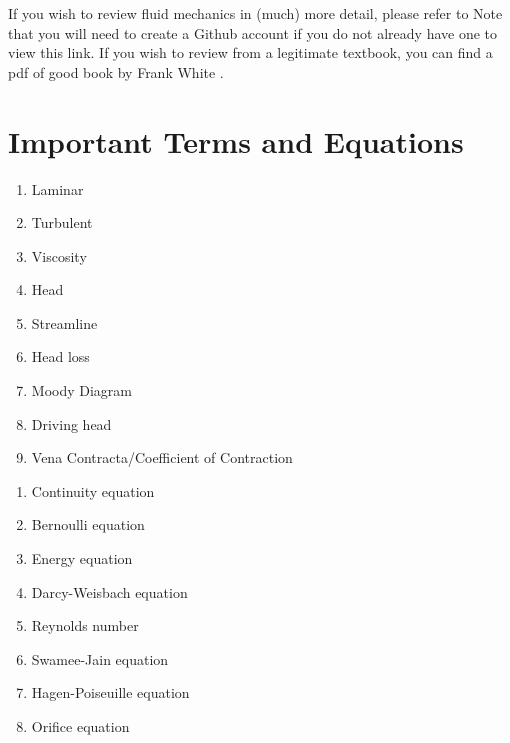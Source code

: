 \documentclass[letterpaper,10pt,english]{sphinxmanual}
\begin{document}
If you wish to review fluid mechanics in (much) more detail, please refer to  Note that you will need to create a Github account if you do not already have one to view this link. If you wish to review from a legitimate textbook, you can find a pdf of good book by Frank White .


\section{Important Terms and Equations}
\label{\detokenize{Fluids_Review/Fluids_Review_Design:important-terms-and-equations}}\label{\detokenize{Fluids_Review/Fluids_Review_Design:fluids-terms-eqs}}
\begin{enumerate}
\item {} 
Laminar

\item {} 
Turbulent

\item {} 
Viscosity

\item {} 
Head

\item {} 
Streamline

\item {} 
Head loss

\item {} 
Moody Diagram

\item {} 
Driving head

\item {} 
Vena Contracta/Coefficient of Contraction

\end{enumerate}

\begin{enumerate}
\item {} 
Continuity equation

\item {} 
Bernoulli equation

\item {} 
Energy equation

\item {} 
Darcy-Weisbach equation

\item {} 
Reynolds number

\item {} 
Swamee-Jain equation

\item {} 
Hagen-Poiseuille equation

\item {} 
Orifice equation

\end{enumerate}
\end{document}
